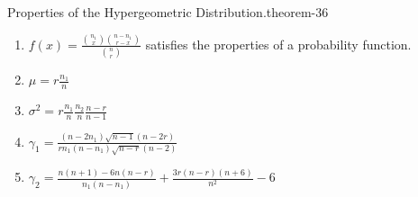 \documentclass[10pt,]{book}
\numberwithin{equation}{section}
\begin{document}
\begin{theorem}{Properties of the Hypergeometric Distribution.}{}{theorem-36}%
\hypertarget{HypergeometricProperties}{}%
\leavevmode%
\begin{enumerate}
\item\hypertarget{li-218}{}\(f(x) = \frac{\binom{n_1}{x} \binom{n-n_1}{r-x}}{\binom{n}{r}}\) satisfies the properties of a probability function.%
\item\hypertarget{li-219}{}\(\mu = r \frac{n_1}{n}\)%
\item\hypertarget{li-220}{}\(\sigma^2 = r \frac{n_1}{n} \frac{n_2}{n} \frac{n-r}{n-1}\)%
\item\hypertarget{li-221}{}\(\gamma_1 = \frac{(n - 2 n_1)\sqrt{n-1}(n - 2r)}{r n_1 (n - n_1) \sqrt{n-r}(n-2)}\)%
\item\hypertarget{li-222}{}\(\gamma_2 = \frac{n(n+1)-6n(n-r)}{n_1(n-n_1)} + \frac{3r(n-r)(n+6)}{n^2} - 6\)%
\end{enumerate}
%
\end{theorem}
\end{document}
